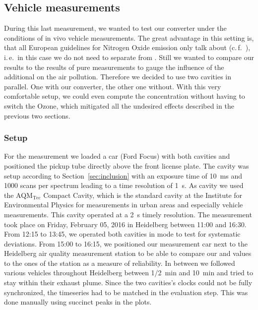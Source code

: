 \subsection{Vehicle measurements}
\label{sec:vehicle}

During this last measurement, we wanted to test our converter under
the conditions of in vivo vehicle measurements. The great advantage in
this setting is, that all European guidelines for Nitrogen Oxide
emission only talk about  (c.\,f.~\cite{eu}), i.\,e.\ in this
case we do not need to separate  from . Still we wanted
to compare our  results to the results of pure 
measurements to gauge the influence of the additional  on the
air pollution. Therefore we decided to use two cavities in
parallel. One with our converter, the other one without. With this
very comfortable setup, we could even compute the 
concentration without having to switch the Ozone, which mitigated all
the undesired effects described in the previous two sections.

\subsubsection{Setup}
\label{sec:vehicle-setup}

For the measurement we loaded a car (Ford Focus) with both cavities
and positioned the pickup tube directly above the front license
plate. The  cavity was setup according to
Section~\ref{sec:inclusion} with an exposure time of
\SI{10}{\milli\second} and 1000 scans per spectrum leading to a time
resolution of \SI{1}{\second}. As 
cavity we used the AQM$_{\text{Tec}}$ Compact Cavity, which is the
standard cavity at the Institute for Environmental Physics for
measurements in urban areas and especially vehicle measurements. This
cavity operated at a \SI{2}{\second} timely resolution. The
measurement took place on Friday, February 05, 2016 in Heidelberg
between 11:00 and 16:30. From 12:15 to 13:45, we operated both
cavities in  mode to test for systematic deviations. From
15:00 to 16:15, we positioned our measurement car next to the
Heidelberg air quality measurement station to be able to compare our
 and  values to the ones of the station as a measure of
reliability. In between we followed various vehicles throughout
Heidelberg between {\nfrac{} 1/2}~\si{\minute} and \SI{10}{\minute}
and tried to stay within their exhaust plume. Since the two cavities's
clocks could not be fully synchronized, the timeseries had to be
matched in the evaluation step. This was done manually using succinct
peaks in the plots.

